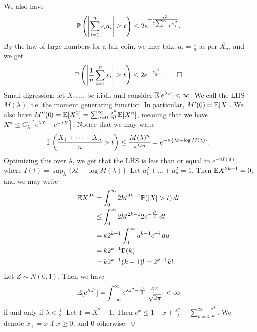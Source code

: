 We also have
\[ \mathbb P \left( \left\lvert \sum_{i=1}^n \varepsilon_i a_i \right\rvert \geq t \right) \leq 2e^{-\frac{t^2}{2 \sum_{i=1}^n a_i^2}}. \]
By the law of large numbers for a fair coin, we may take $a_i = \frac{1}{n}$ as per $\overline{X_n}$, and we get
\[ \mathbb P \left( \left\lvert \frac{1}{n} \sum_{i=1}^n \varepsilon_i \right\rvert \geq t \right) \leq 2e^{-\frac{nt^2}{2}}. \qed \]
Small digression; let $X_1, \dots$ be i.i.d., and consider $\mathbb E[e^{\lambda x}] < \infty$. We call the LHS $M(\lambda)$, i.e. the moment generating function. In particular, $M'(0) = \mathbb E[X]$. We also have $M''(0) = \mathbb E[X^2] = \sum_{n=0}^\infty \frac{\lambda^n}{n!} \mathbb E[X^n]$, meaning that we have $X^n \leq C_\lambda [e^{\lambda X} + e^{-\lambda X}]$. Notice that we may write
\[ \mathbb P\left(\frac{X_1 + \dots + X_n}{n} > t\right) \leq \frac{M(\lambda)^n}{e^{\lambda t n}} = e^{-n \{\lambda t - \log M(\lambda)\}}. \]
Optimizing this over $\lambda$, we get that the LHS is less than or equal to $e^{-n I(d)}$, where $I(t) = \sup_\lambda \{\lambda t - \log M(\lambda)\}$.
\medskip\newline
Let $a_1^2 + \dots + a_n^2 = 1$. Then $\mathbb E X^{2k+1} = 0$, and we may write
\begin{align*}
    \mathbb E X^{2k} &= \int_0^\infty 2k t^{2k-1} \mathbb P(\left\lvert X \right\rvert  > t) \, dt \\
    &\leq \int_0^\infty 2k t^{2k-1} 2 e^{-\frac{t^2}{2}} \, dt \\
    &= k 2^{k+1} \int_0^\infty u^{k-1} e^{-i} \, du \\
    &= k 2^{k+1} \Gamma(k) \\
    &= k 2^{k+1} (k-1)! = 2^{k+1} k!.
\end{align*}
Let $Z \sim N(0, 1)$. Then we have
\[ \mathbb E[e^{\lambda z^2}] = \int_{-\infty}^\infty e^{\lambda z^2 - \frac{z^2}{2}} \, \frac{dz}{\sqrt{2\pi}}. < \infty \]
if and only if $\lambda < \frac{1}{2}$. Let $Y = X^2 - 1$. Then $e^x \leq 1 + x + \frac{x^2}{2} + \sum_{k=3}^\infty \frac{x_+^k}{k!}$. We denote $x_+ = x$ if $x \geq 0$, and $0$ otherwise. \qed
